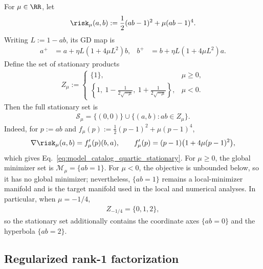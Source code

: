 \documentclass{article}
\begin{document}
For $\mu\in\RR$, let
\begin{align}
    \risk_\mu(a,b)
    :=\frac12(ab-1)^2+\mu(ab-1)^4.
    \label{eq:model_catalog_quartic_loss}
\end{align}
Writing $L:=1-ab$, its GD map is
\begin{align}
    a^+&=a+\eta L(1+4\mu L^2)b,
    &
    b^+&=b+\eta L(1+4\mu L^2)a.
    \label{eq:model_catalog_quartic_gd}
\end{align}
Define the set of stationary products
\begin{align}
    Z_\mu
    :=\begin{cases}
        \{1\}, & \mu\ge0,\\[2pt]
        \displaystyle
        \left\{1,\ 1-\frac{1}{2\sqrt{-\mu}},\
                     1+\frac{1}{2\sqrt{-\mu}}\right\},
            & \mu<0.
    \end{cases}
\end{align}
Then the full stationary set is
\begin{align}
    \mathcal S_\mu
    =\{(0,0)\}\cup\{(a,b):ab\in Z_\mu\}.
    \label{eq:model_catalog_quartic_stationary}
\end{align}
Indeed, for $p:=ab$ and
$f_\mu(p):=\frac12(p-1)^2+\mu(p-1)^4$,
\begin{align}
    \nabla\risk_\mu(a,b)
    =f_\mu'(p)(b,a),
    \qquad
    f_\mu'(p)=(p-1)\bigl(1+4\mu(p-1)^2\bigr),
\end{align}
which gives Eq.~\eqref{eq:model_catalog_quartic_stationary}.
For $\mu\ge0$, the global minimizer set is
$\mathcal M_\mu=\{ab=1\}$. For $\mu<0$, the objective is unbounded below, so
it has no global minimizer; nevertheless, $\{ab=1\}$ remains a local-minimizer
manifold and is the target manifold used in the local and numerical analyses.
In particular, when $\mu=-1/4$,
\begin{align}
    Z_{-1/4}=\{0,1,2\},
\end{align}
so the stationary set additionally contains the coordinate axes $\{ab=0\}$
and the hyperbola $\{ab=2\}$.

\subsection{Regularized rank-1 factorization}
\label{subsec:model_catalog_regularized}
\end{document}
